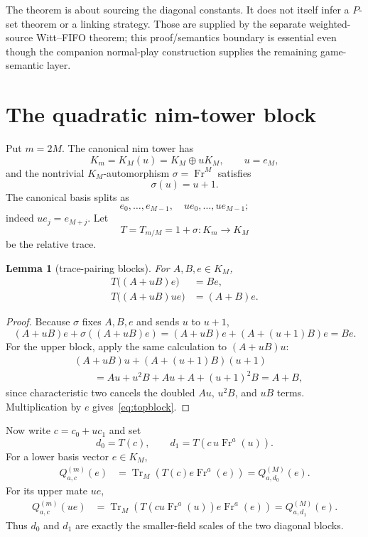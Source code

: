 \documentclass[11pt]{article}
\newtheorem{lemma}[theorem]{Lemma}
\theoremstyle{remark}
\newcommand{\Tr}{\operatorname{Tr}}
\newcommand{\Fr}{\operatorname{Fr}}
\begin{document}
The theorem is about sourcing the diagonal constants. It does not itself
infer a $P$-set theorem or a linking strategy. Those are supplied by the
separate weighted-source Witt--FIFO theorem; this proof/semantics boundary is
essential even though the companion normal-play construction supplies the
remaining game-semantic layer.

\section{The quadratic nim-tower block}

Put $m=2M$.  The canonical nim tower has
\[
 K_m=K_M(u)=K_M\oplus uK_M,
 \qquad u=e_M,
\]
and the nontrivial $K_M$-automorphism $\sigma=\Fr^M$ satisfies
\[
 \sigma(u)=u+1.
\]
The canonical basis splits as
\[
 e_0,\ldots,e_{M-1},\quad ue_0,\ldots,ue_{M-1};
\]
indeed $ue_j=e_{M+j}$.  Let
\[
 T=T_{m/M}=1+\sigma:K_m\longrightarrow K_M
\]
be the relative trace.

\begin{lemma}[trace-pairing blocks]\label{lem:blocks}
For $A,B,e\in K_M$,
\begin{align}
 T\bigl((A+uB)e\bigr)&=Be,\label{eq:lowblock}\\
 T\bigl((A+uB)ue\bigr)&=(A+B)e.\label{eq:topblock}
\end{align}
\end{lemma}

\begin{proof}
Because $\sigma$ fixes $A,B,e$ and sends $u$ to $u+1$,
\[
 (A+uB)e+\sigma((A+uB)e)
 =(A+uB)e+(A+(u+1)B)e=Be.
\]
For the upper block, apply the same calculation to $(A+uB)u$:
\begin{align*}
 &(A+uB)u+(A+(u+1)B)(u+1)\\
 &\qquad=Au+u^2B+Au+A+(u+1)^2B=A+B,
\end{align*}
since characteristic two cancels the doubled $Au$, $u^2B$, and $uB$
terms.  Multiplication by $e$ gives~\eqref{eq:topblock}.
\end{proof}

Now write $c=c_0+uc_1$ and set
\begin{equation}\label{eq:scales}
 d_0=T(c),\qquad
 d_1=T\!\left(c\,u\Fr^a(u)\right).
\end{equation}
For a lower basis vector $e\in K_M$,
\begin{align*}
 Q^{(m)}_{a,c}(e)
 &=\Tr_M\!\left(T(c)e\Fr^a(e)\right)
 =Q^{(M)}_{a,d_0}(e).
\end{align*}
For its upper mate $ue$,
\begin{align*}
 Q^{(m)}_{a,c}(ue)
 &=\Tr_M\!\left(T(cu\Fr^a(u))e\Fr^a(e)\right)
 =Q^{(M)}_{a,d_1}(e).
\end{align*}
Thus $d_0$ and $d_1$ are exactly the smaller-field scales of the two
diagonal blocks.
\end{document}
